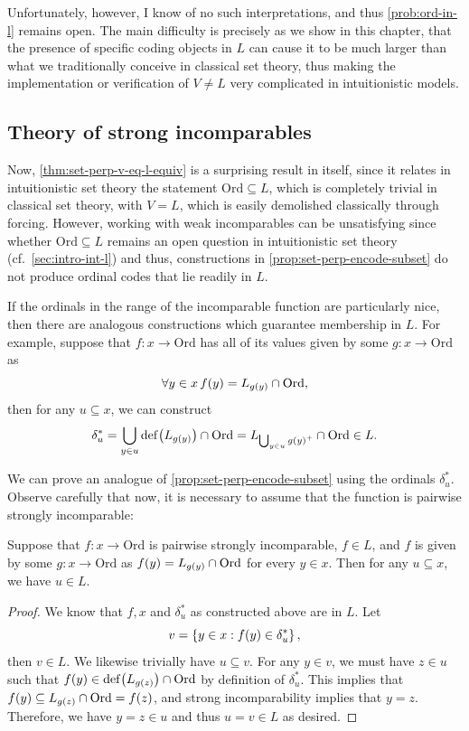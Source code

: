 \documentclass[12pt,openany]{book}
\theoremstyle{plain}
\theoremstyle{definition}
\newcommand\opA[1]{\mathop{\forall #1}}
\DeclareMathOperator\dd{def}
\newcommand\Ord{\mathrm{Ord}}
\begin{document}
Unfortunately, however, I know of no such interpretations, and thus \autoref{prob:ord-in-l} remains open. The main difficulty is precisely as we show in this chapter, that the presence of specific coding objects in $L$ can cause it to be much larger than what we traditionally conceive in classical set theory, thus making the implementation or verification of $V \neq L$ very complicated in intuitionistic models.

\subsection*{Theory of strong incomparables}

Now, \autoref{thm:set-perp-v-eq-l-equiv} is a surprising result in itself, since it relates in intuitionistic set theory the statement $\Ord \subseteq L$, which is completely trivial in classical set theory, with $V = L$, which is easily demolished classically through forcing. However, working with weak incomparables can be unsatisfying since whether $\Ord \subseteq L$ remains an open question in intuitionistic set theory (cf.\ \autoref{sec:intro-int-l}) and thus, constructions in \autoref{prop:set-perp-encode-subset} do not produce ordinal codes that lie readily in $L$.

If the ordinals in the range of the incomparable function are particularly nice, then there are analogous constructions which guarantee membership in $L$. For example, suppose that $f : x \rightarrow \Ord$ has all of its values given by some $g : x \rightarrow \Ord$ as
\[\opA{y \in x} f\mleft(y\mright) = L_{g\mleft(y\mright)} \cap \Ord,\]
then for any $u \subseteq x$, we can construct
\[\delta^*_u = \bigcup_{y \in u} \dd\mleft(L_{g\mleft(y\mright)}\mright) \cap \Ord = L_{\bigcup_{y \in u} g\mleft(y\mright)^+} \cap \Ord \in L.\]

We can prove an analogue of \autoref{prop:set-perp-encode-subset} using the ordinals $\delta^*_u$. Observe carefully that now, it is necessary to assume that the function is pairwise strongly incomparable:
\begin{proposition}
  \label{prop:l-ord-strong-incom-code}
  Suppose that $f : x \rightarrow \Ord$ is pairwise strongly incomparable, $f \in L$, and $f$ is given by some $g : x \rightarrow \Ord$ as $f\mleft(y\mright) = L_{g\mleft(y\mright)} \cap \Ord$ for every $y \in x$. Then for any $u \subseteq x$, we have $u \in L$.
\end{proposition}

\begin{proof}
  We know that $f, x$ and $\delta^*_u$ as constructed above are in $L$. Let
  \[v  = \left\{y \in x : f\mleft(y\mright) \in \delta^*_u\right\},\]
  then $v \in L$. We likewise trivially have $u \subseteq v$. For any $y \in v$, we must have $z \in u$ such that $f\mleft(y\mright) \in \dd\mleft(L_{g\mleft(z\mright)}\mright) \cap \Ord$ by definition of $\delta^*_u$. This implies that $f\mleft(y\mright) \subseteq L_{g\mleft(z\mright)} \cap \Ord = f\mleft(z\mright)$, and strong incomparability implies that $y = z$. Therefore, we have $y = z \in u$ and thus $u = v \in L$ as desired.
\end{proof}
\end{document}
